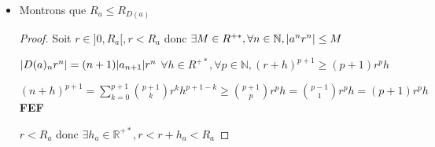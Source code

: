 \documentclass[11pt,hidelinks]{book}
\theoremstyle{mytheoremstyle}
\theoremstyle{mytheoremstyle}
\theoremstyle{mytheoremstyle}
\theoremstyle{mytheoremstyle}
\theoremstyle{mytheoremstyle}
\theoremstyle{mytheoremstyle}
\theoremstyle{mytheoremstyle}
\theoremstyle{mytheoremstyle}
\theoremstyle{myproblemstyle}
\def\mbb#1{\mathbb{#1}}
\def\bN{\mbb{N}}
\def\bR{\mbb{R}}
\def\fef{\textbf{FEF}}
\begin{document}
\begin{adjustwidth}{-2em}{-1em}
\begin{prop}
\begin{enumerate}
\begin{itemize}
            \item Montrons que $R_a \leq R_{D(a)}$ 
            \begin{proof}
                
                
                Soit $r \in ]0,R_a[, r < R_a$ donc $\exists M \in R^{+*}, \forall n \in \bN, \abs{a^n r^n} \leq M$
                
                $\abs{D(a)_n r^n} = (n+1) \abs{a_{n+1}} r^n$  
                $\forall h \in R^{+*}, \forall p \in \bN, (r + h)^{p+1} \geq (p+1) r^p h$
                \begin{ef}
                    $(n+h)^{p+1} = \sum_{k=0}^{p+1} \binom{p+1}{k} r^k h^{p+1-k} \geq \binom{p+1}{p} r^p h = \binom{p-1}{1} r^p h = (p+1)r^ph$ \fef
                \end{ef}
                $r < R_a$ donc $\exists h_a \in \bR^{+*}, r < r + h_a < R_a$
                 

\end{proof}
\end{itemize}
\end{enumerate}
\end{prop}
\end{adjustwidth}
\end{document}
